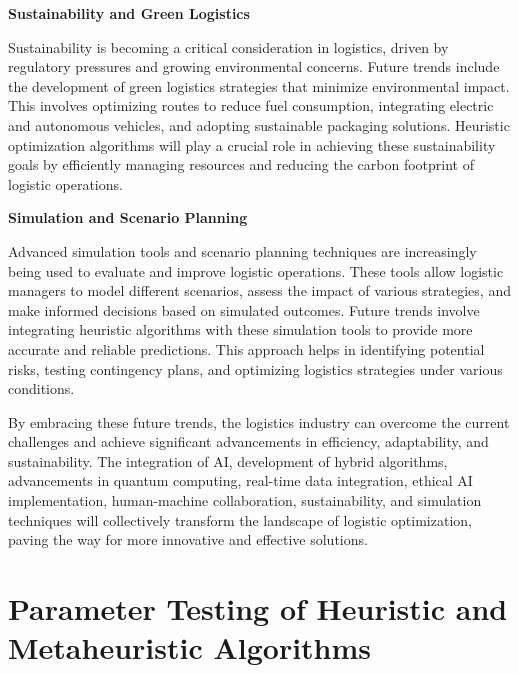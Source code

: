 \documentclass[
]{article}
\begin{document}
    \textbf{Sustainability and Green Logistics}

    Sustainability is becoming a critical consideration in logistics, driven by regulatory pressures and growing environmental concerns. Future trends include the development of green logistics strategies that minimize environmental impact. This involves optimizing routes to reduce fuel consumption, integrating electric and autonomous vehicles, and adopting sustainable packaging solutions. Heuristic optimization algorithms will play a crucial role in achieving these sustainability goals by efficiently managing resources and reducing the carbon footprint of logistic operations.

    \textbf{Simulation and Scenario Planning}

    Advanced simulation tools and scenario planning techniques are increasingly being used to evaluate and improve logistic operations. These tools allow logistic managers to model different scenarios, assess the impact of various strategies, and make informed decisions based on simulated outcomes. Future trends involve integrating heuristic algorithms with these simulation tools to provide more accurate and reliable predictions. This approach helps in identifying potential risks, testing contingency plans, and optimizing logistics strategies under various conditions.

    By embracing these future trends, the logistics industry can overcome the current challenges and achieve significant advancements in efficiency, adaptability, and sustainability. The integration of AI, development of hybrid algorithms, advancements in quantum computing, real-time data integration, ethical AI implementation, human-machine collaboration, sustainability, and simulation techniques will collectively transform the landscape of logistic optimization, paving the way for more innovative and effective solutions.


    \newpage


    \section{Parameter Testing of Heuristic and Metaheuristic Algorithms}\label{sec:parameter-testing-of-heuristic-and-metaheuristic-algorithms}
\end{document}
